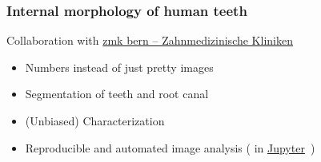 \documentclass[aspectratio=169]{beamer}
\newcommand{\imagewidth}{\linewidth}%
\newcommand{\imageheight}{0.618\paperheight}%
\begin{document}
\begin{frame}
	\frametitle{Internal morphology of human teeth}
	Collaboration with \href{https://www.zmk.unibe.ch/}{zmk bern – Zahnmedizinische Kliniken}
	\begin{itemize}
		\item Numbers instead of just pretty images
		\item Segmentation of teeth and root canal
		\item (Unbiased) Characterization
		\item Reproducible and automated image analysis (\href{https://www.python.org/}{\faPython} in \href{https://jupyter.org/}{Jupyter}~\cite{Kluyver2016})
	\end{itemize}
\end{frame}

\renewcommand{\imagewidth}{0.75\linewidth}
\renewcommand{\imageheight}{0.618\paperheight}
\end{document}
